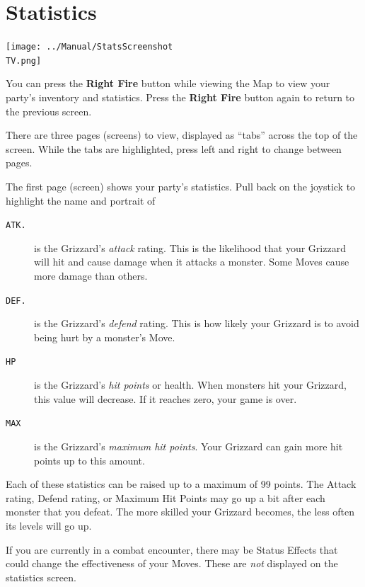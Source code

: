 \documentclass[10pt,twocolumn,openany,article]{memoir}
\newcommand\TV{NTSC}
\newcommand\TV{PAL}
\begin{document}
\section{Statistics}

\begin{center}
  \texttt{[image: ../Manual/StatsScreenshot\\TV.png]}
\end{center}

You can  press the \textbf{Right Fire}  button while viewing the  Map to
view  your party's  inventory  and statistics.  Press the  \textbf{Right
  Fire} button again to return to the previous screen.

There are three pages (screens) to view, displayed as ``tabs'' across the top of
the screen.  While the  tabs are  highlighted, press  left and  right to
change between pages.

The first page (screen) shows your  party's statistics. Pull back on the
joystick to highlight the name and portrait of 

\begin{description}
  
\item[\texttt{ATK.}] is the Grizzard's  \emph{attack} rating. This is the
  likelihood  that your  Grizzard  will  hit and  cause  damage when  it
  attacks a monster. Some Moves cause more damage than others.
  
\item[\texttt{DEF.}] is the Grizzard's  \emph{defend} rating. This is how
  likely your Grizzard is to avoid being hurt by a monster's Move.

\item[\texttt{HP}]  is  the  Grizzard's  \emph{hit  points}  or  health.
  When  monsters hit  your Grizzard,  this  value will  decrease. If  it
  reaches zero, your game is over.

\item[\texttt{MAX}]  is   the  Grizzard's  \emph{maximum   hit  points}.
  Your Grizzard can gain more hit points up to this amount.
  
\end{description}

Each of  these statistics can  be raised up to  a maximum of  99 points.
The Attack  rating, Defend  rating, or  Maximum Hit  Points may  go up
a bit after each monster that you defeat. The more skilled your Grizzard
becomes, the less often its levels will go up.

If you are currently in a  combat encounter, there may be Status Effects
that could change the effectiveness  of your Moves. These are \emph{not}
displayed on the statistics screen.
\end{document}
